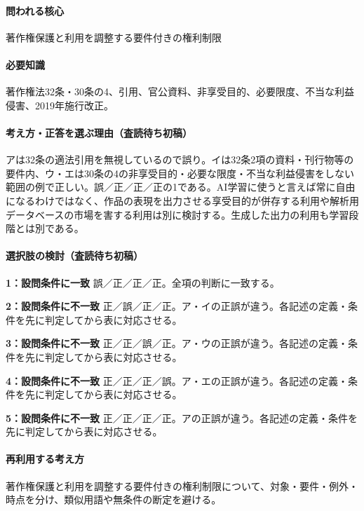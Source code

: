 \paragraph{問われる核心} 著作権保護と利用を調整する要件付きの権利制限

\paragraph{必要知識} 著作権法32条・30条の4、引用、官公資料、非享受目的、必要限度、不当な利益侵害、2019年施行改正。

\paragraph{考え方・正答を選ぶ理由（査読待ち初稿）} アは32条の適法引用を無視しているので誤り。イは32条2項の資料・刊行物等の要件内、ウ・エは30条の4の非享受目的・必要な限度・不当な利益侵害をしない範囲の例で正しい。誤／正／正／正の1である。AI学習に使うと言えば常に自由になるわけではなく、作品の表現を出力させる享受目的が併存する利用や解析用データベースの市場を害する利用は別に検討する。生成した出力の利用も学習段階とは別である。

\paragraph{選択肢の検討（査読待ち初稿）}\mbox{}\par

\noindent\textbf{1：設問条件に一致} 誤／正／正／正。全項の判断に一致する。\par

\noindent\textbf{2：設問条件に不一致} 正／誤／正／正。ア・イの正誤が違う。各記述の定義・条件を先に判定してから表に対応させる。\par

\noindent\textbf{3：設問条件に不一致} 正／正／誤／正。ア・ウの正誤が違う。各記述の定義・条件を先に判定してから表に対応させる。\par

\noindent\textbf{4：設問条件に不一致} 正／正／正／誤。ア・エの正誤が違う。各記述の定義・条件を先に判定してから表に対応させる。\par

\noindent\textbf{5：設問条件に不一致} 正／正／正／正。アの正誤が違う。各記述の定義・条件を先に判定してから表に対応させる。\par

\paragraph{再利用する考え方} 著作権保護と利用を調整する要件付きの権利制限について、対象・要件・例外・時点を分け、類似用語や無条件の断定を避ける。

